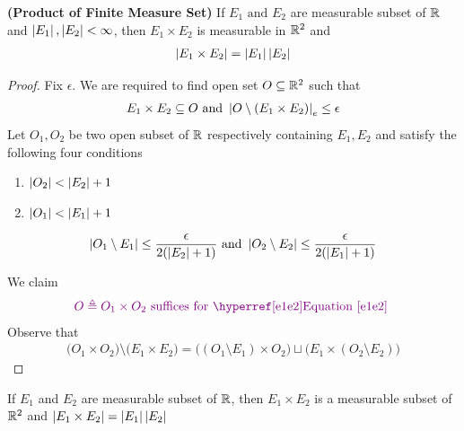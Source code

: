 \documentclass{report}
\begin{document}
\begin{theorem}
\textbf{(Product of Finite Measure Set)} If $E_1\text{ and }E_2$ are measurable subset of $\mathbb{R} $ and $\left|E_1\right|,\left|E_2\right|<\infty$, then $E_1\times E_2$ is measurable in $\mathbb{R}^2$ and 
 \begin{align*}
\left|E_1\times E_2\right| = \left|E_1\right| \left|E_2\right|
\end{align*}
\end{theorem}
\begin{proof}
Fix $\epsilon $. We are required to find open set $O\subseteq \mathbb{R}^2$ such that 
\begin{align}
\label{e1e2}
E_1 \times E_2 \subseteq O\text{ and } \left|O \setminus (E_1 \times E_2)\right|_e \leq  \epsilon 
\end{align}
  Let $O_1,O_2$ be two open subset of $\mathbb{R}$ respectively containing $E_1,E_2$ and satisfy the following four conditions 
\begin{enumerate}[label=(\alph*)]
  \item $\left|O_2\right|< \left|E_2\right| + 1$ 
  \item $\left|O_1\right|< \left|E_1\right|+1 $
\end{enumerate}
\begin{align*}
\left|O_1\setminus E_1\right|\leq \frac{\epsilon }{2(\left|E_2\right|+1)}\text{ and }\left|O_2 \setminus E_2\right|\leq \frac{\epsilon }{2(\left|E_1\right|+1)}
\end{align*}

We claim 
\begin{align*}
\vi{O\triangleq O_1\times O_2 \text{ suffices for \myref{Equation}{e1e2} }}
\end{align*}
Observe that 
\begin{align*}
\Big(O_1 \times O_2 \Big) \setminus \Big(E_1 \times E_2  \Big) = \Big((O_1 \setminus E_1) \times O_2 \Big)  \sqcup \Big( E_1 \times (O_2 \setminus E_2) \Big)
\end{align*}
\end{proof}
\begin{question}{}{}
If $E_1$ and  $E_2$ are measurable subset of  $\mathbb{R}$, then $E_1\times E_2$ is a measurable subset of $\mathbb{R}^2$ and  $\left|E_1\times E_2\right|=\left|E_1\right|\left|E_2\right|$
\end{question}
\end{document}
